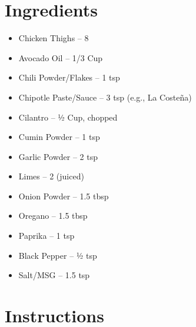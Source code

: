 




\section*{Ingredients}

\begin{itemize}
      \item Chicken Thighs – 8
      \item[\measure] Avocado Oil – 1/3 Cup
      \item[\measure] Chili Powder/Flakes – 1 tsp
      \item[\measure] Chipotle Paste/Sauce – 3 tsp (e.g., La Costeña)
      \item[\cut] Cilantro – ½ Cup, chopped
      \item[\measure] Cumin Powder – 1 tsp
      \item[\measure] Garlic Powder – 2 tsp
      \item[\measure] Limes – 2 (juiced)
      \item[\measure] Onion Powder – 1.5 tbsp
      \item[\measure] Oregano – 1.5 tbsp
      \item[\measure] Paprika – 1 tsp
      \item[\measure] Black Pepper – ½ tsp
      \item[\measure] Salt/MSG – 1.5 tsp
\end{itemize}

\newpage
{}
\section*{Instructions}

